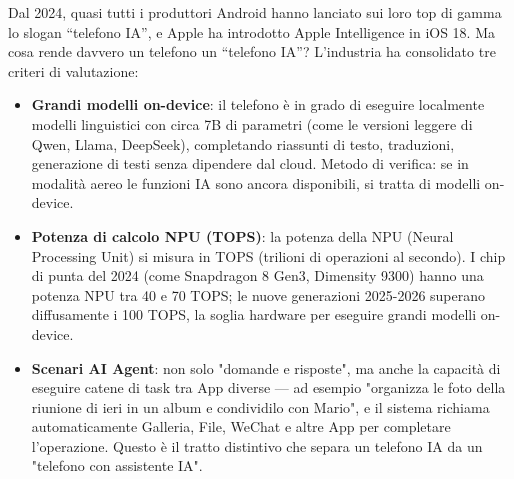 


Dal 2024, quasi tutti i produttori Android hanno lanciato sui loro top di gamma lo slogan “telefono IA”, e Apple ha introdotto Apple Intelligence in iOS 18. Ma cosa rende davvero un telefono un “telefono IA”? L'industria ha consolidato tre criteri di valutazione:

\begin{itemize}
  \item \textbf{Grandi modelli on-device}: il telefono è in grado di eseguire localmente modelli linguistici con circa 7B di parametri (come le versioni leggere di Qwen, Llama, DeepSeek), completando riassunti di testo, traduzioni, generazione di testi senza dipendere dal cloud. Metodo di verifica: se in modalità aereo le funzioni IA sono ancora disponibili, si tratta di modelli on-device.
  \item \textbf{Potenza di calcolo NPU (TOPS)}: la potenza della NPU (Neural Processing Unit) si misura in TOPS (trilioni di operazioni al secondo). I chip di punta del 2024 (come Snapdragon 8 Gen3, Dimensity 9300) hanno una potenza NPU tra 40 e 70 TOPS; le nuove generazioni 2025-2026 superano diffusamente i 100 TOPS, la soglia hardware per eseguire grandi modelli on-device.
  \item \textbf{Scenari AI Agent}: non solo "domande e risposte", ma anche la capacità di eseguire catene di task tra App diverse — ad esempio "organizza le foto della riunione di ieri in un album e condividilo con Mario", e il sistema richiama automaticamente Galleria, File, WeChat e altre App per completare l'operazione. Questo è il tratto distintivo che separa un telefono IA da un "telefono con assistente IA".
\end{itemize}

